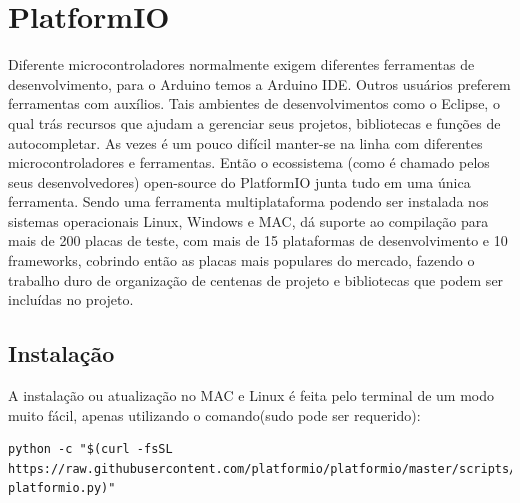 \documentclass[a4paper,12pt,portuguese]{ufms-cpcx}
\begin{document}
\section{PlatformIO}
Diferente microcontroladores normalmente exigem diferentes ferramentas de desenvolvimento, para o Arduino temos a Arduino IDE. Outros usuários preferem ferramentas com auxílios. Tais ambientes de desenvolvimentos como o Eclipse, o qual trás recursos que ajudam a gerenciar seus projetos, bibliotecas e funções de autocompletar. As vezes é um pouco difícil manter-se na linha com diferentes microcontroladores e ferramentas. Então o ecossistema (como é chamado pelos seus desenvolvedores) open-source do PlatformIO junta tudo em uma única ferramenta. Sendo uma ferramenta multiplataforma podendo ser instalada nos sistemas operacionais Linux, Windows e MAC, dá suporte ao compilação para mais de 200 placas de teste, com mais de 15 plataformas de desenvolvimento e 10 frameworks, cobrindo então as placas mais populares do mercado, fazendo o trabalho duro de organização de centenas de projeto e bibliotecas que podem ser incluídas no projeto.
\subsection{Instalação}
A instalação ou atualização no MAC e Linux é feita pelo terminal de um modo muito fácil, apenas utilizando o comando(sudo pode ser requerido): 
\begin{lstlisting}
python -c "$(curl -fsSL https://raw.githubusercontent.com/platformio/platformio/master/scripts/get-platformio.py)"
\end{lstlisting}
\end{document}
